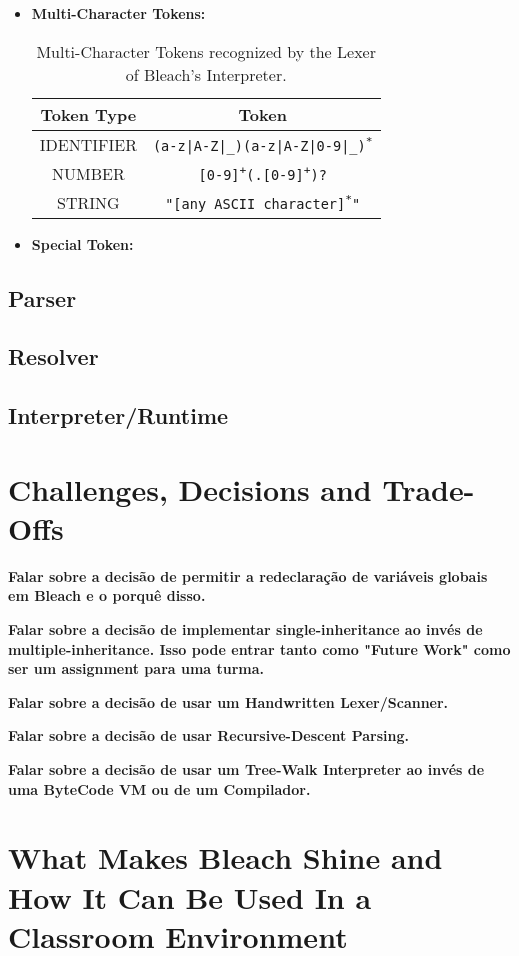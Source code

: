 \begin{itemize}
    \item \textbf{Multi-Character Tokens:}
    \begin{table}[H]
    \centering
        \begin{tabular}{|c|c|}
        \hline
        Token Type & Token \\ \hline
        IDENTIFIER & \texttt{(a-z|A-Z|\_)(a-z|A-Z|0-9|\_)\textsuperscript{*}} \\ \hline
        NUMBER & \texttt{[0-9]\textsuperscript{+}(.[0-9]\textsuperscript{+})?} \\ \hline
        STRING & \texttt{"[any ASCII character]\textsuperscript{*}"} \\ \hline      
        \end{tabular}
        \caption{Multi-Character Tokens recognized by the Lexer of Bleach's Interpreter.}
    \end{table}

    \item \textbf{Special Token:}
    
\end{itemize}

\subsection{Parser}
\subsection{Resolver}
\subsection{Interpreter/Runtime}

\section{Challenges, Decisions and Trade-Offs}
\textbf{Falar sobre a decisão de permitir a redeclaração de variáveis globais em Bleach e o porquê disso.}

\textbf{Falar sobre a decisão de implementar single-inheritance ao invés de multiple-inheritance. Isso pode entrar tanto como "Future Work" como ser um assignment para uma turma.}

\textbf{Falar sobre a decisão de usar um Handwritten Lexer/Scanner.}

\textbf{Falar sobre a decisão de usar Recursive-Descent Parsing.}

\textbf{Falar sobre a decisão de usar um Tree-Walk Interpreter ao invés de uma ByteCode VM ou de um Compilador.}


\section{What Makes Bleach Shine and How It Can Be Used In a Classroom Environment}